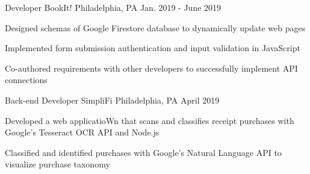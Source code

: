 

\begin{cventries}

  \cventry
  {Developer} %
  {BookIt!} %
  {Philadelphia, PA} %
  {Jan. 2019 - June 2019} %
  {
    \begin{cvitems} %
      \item {Designed schemas of Google Firestore database to dynamically update web pages}
      \item {Implemented form submission authentication and input validation in JavaScript}
      \item {Co-authored requirements with other developers to successfully implement API connections}
    \end{cvitems}
  }

  \cventry
  {Back-end Developer} %
  {SimpliFi} %
  {Philadelphia, PA} %
  {April 2019} %
  {
    \begin{cvitems} %
      \item {Developed a web applicatioWn that scans and classifies receipt purchases with Google’s Tesseract OCR API and Node.js}
      \item {Classified and identified purchases with Google’s Natural Language API to visualize purchase taxonomy}
    \end{cvitems}
  }

\end{cventries}
